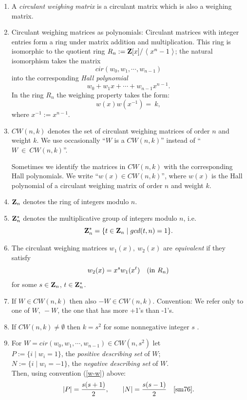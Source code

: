 {\begin{enumerate}
     \item A {\it circulant weighing matrix } is a circulant  matrix which is 
	   also a weighing matrix. 
     
     \item Circulant weighing matrices as polynomials:
	Circulant matrices with integer entries form a ring under matrix  addition and 
	multiplication. This ring is 
	isomorphic to the quotient ring \- $R_n:={\bf Z}[x]/~\langle~x^n-1~\rangle$; 
	\- the natural isomorphism
	takes the matrix 
	$$cir(w_0,w_1, \cdots, w_{n-1})$$ 
	into the corresponding {\it Hall polynomial}
	$$w_0+w_1x+ \cdots+ w_{n-1}x^{n-1}.$$ In the ring 
	$R_n$ the weighing property takes the form: 
		$$w(x)w(x^{-1})=~k,$$
	where $x^{-1}:=x^{n-1}$.
	  
     \item  $CW(n,k)$ denotes the set of circulant weighing matrices of order 
	   $n$ and weight $k$. We use occasionally ``$W$ is a $CW(n,k)$'' instead 
	   of \- ``$W~\in~CW(n,k)$''. 
	   
	   Sometimes we identify the matrices in  $CW(n,k)$ with the 
	   corresponding Hall polynomials. 
	   We write \- ``$w(x) \in CW(n,k)$'', where  
	   $w(x)$ is the Hall polynomial of a circulant weighing matrix of 
	   order $n$ and weight $k$.

     
     \item ${\bf Z}_n$ denotes the ring of integers modulo $n$. 
     
     \item ${\bf Z}^{*}_n$ denotes the multiplicative group of integers modulo $n$, i.e.
	$$ {\bf Z}^{*}_n=\{ t \in {\bf Z}_n \mid gcd(t,n)=1\}.$$
     
     \item \label{eque}
	The circulant weighing matrices $w_1(x), \ w_2(x)$ are {\it 
	equivalent} if they satisfy 
		$$w_2(x)=x^{s}w_1(x^t) \quad  ({\rm in} \ R_n)$$ 
	for some $s \in {\bf Z}_n$, $t \in {\bf Z}^{*}_n$.
     
     \item \label{w-w}
	If $W \in CW(n,k)$ then also \-$-W \in CW(n,k)$. Convention: We refer only to
	one of $W, \ -W$, the one that has more +1's than -1's. 
     
     \item If $CW(n,k) \neq \emptyset$ then $k=s^2$ for some nonnegative integer $s$ \cite{sm76}.
     
     \item \label{mul}
       For $W=cir(w_0,w_1, \cdots ,w_{n-1}) \in CW(n,s^2)$ let \\
       $ P:=\{i \mid w_{i}=1\}$, the {\it positive describing set} of $W$;\\
       $ N:=\{i \mid w_{i}=-1\}$, the {\it negative describing set} of $W$.\\
       Then, using convention (\ref{w-w}) above: 
	$$|P|=\frac{s(s+1)}{2}, \qquad  |N|=\frac{s(s-1)}{2} \quad {\rm \cite{sm76}}.$$
     

\end{enumerate}}
